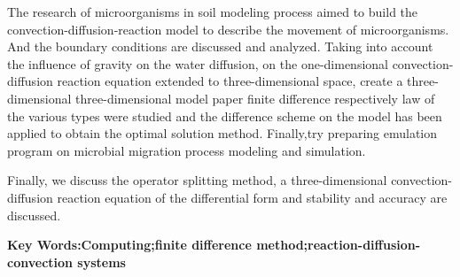 The research of microorganisms in soil modeling process aimed to build the convection-diffusion-reaction model to describe the movement of microorganisms.
And the boundary conditions are discussed and analyzed. Taking into account the influence of gravity
on the water diffusion, on the one-dimensional convection-diffusion reaction equation extended to 
three-dimensional space, create a three-dimensional three-dimensional model paper finite difference 
respectively law of the various types were studied and the difference scheme on the model has been 
applied to obtain the optimal solution method. Finally,try preparing emulation program on microbial
migration process modeling and simulation.\par
Finally, we discuss the operator splitting method, a three-dimensional convection-diffusion
reaction equation of the differential form and stability and accuracy are discussed.
\vspace*{1.5em}\par
\noindent\textbf{Key Words:Computing;finite difference method;reaction-diffusion-convection systems}